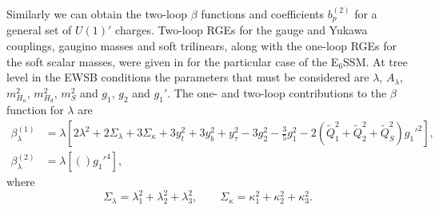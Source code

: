 \documentclass[preprint,amsmath,amssymb,aps,superscriptaddress,prd,showpacs,floatfix]{revtex4-1}
\begin{document}
Similarly we can obtain the two-loop $\beta$ functions and coefficients $b_p^{(2)}$ for a general set of $U(1)'$ charges. Two-loop RGEs for the gauge and Yukawa couplings, gaugino masses and soft trilinears, along with the one-loop RGEs for the soft scalar masses, were given in \cite{Athron:2009bs} for the particular case of the E$_6$SSM. At tree level in the EWSB conditions the parameters that must be considered are $\lambda$, $A_\lambda$, $m_{H_u}^2$, $m_{H_d}^2$, $m_S^2$ and $g_1$, $g_2$ and $g_1'$. The one- and two-loop contributions to the $\beta$ function for $\lambda$ are
\begin{subequations}\label{eq:USSMLambdaBetas}
\begin{align}
\beta_\lambda^{(1)}&=\lambda  \left[2\lambda ^2+2 \Sigma_\lambda +3 \Sigma_\kappa +3 y_t^2+3 y_b^2+y_{\tau }^2-3 g_2^2-\frac{3}{5} g_1^2 -2 \left ( \tilde{Q}_1^2 + \tilde{Q}_2^2 + \tilde{Q}_S^2\right )g_1'^2 \right],\label{eq:USSMLambdaBetaOneLoop}\\
\beta_\lambda^{(2)}&=\lambda \left [ \left ( \right )g_1'^4\right ],\label{eq:USSMLambdaBetaTwoLoop}
\end{align}
\end{subequations}
where
\begin{equation*}
\Sigma_\lambda=\lambda_1^2+\lambda_2^2+\lambda_3^2, \qquad \Sigma_\kappa=\kappa_1^2+\kappa_2^2+\kappa_3^2.
\end{equation*}
{}
\end{document}
